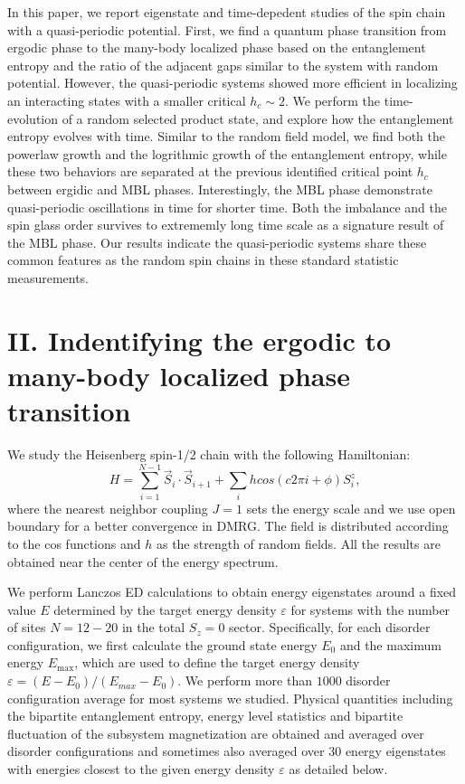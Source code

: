 \documentclass[prl,aps,epsf,showpacs,twocolumn]{revtex4}
\begin{document}
In this paper, we report  eigenstate and  time-depedent studies of the spin chain with a quasi-periodic potential.
First, we find a  quantum phase transition from ergodic phase to the many-body localized phase based on the
entanglement entropy and the ratio of the adjacent gaps similar to the system with random potential. However,  the quasi-periodic
systems showed more efficient in localizing an interacting states with a smaller critical $h_c \sim 2$.     
We perform the time-evolution of a random selected  product state, and explore how the entanglement entropy
evolves with time.  Similar to the random field model, we find both the powerlaw  growth and the logrithmic growth
of the entanglement entropy,  while these two  behaviors are separated at the previous identified critical point
$h_c$ between ergidic and MBL phases.   Interestingly,  the MBL phase demonstrate quasi-periodic oscillations
in time for shorter time.  Both the imbalance and the spin glass order survives to extrememly long time scale
as a signature result of the MBL phase.   Our results indicate the quasi-periodic systems share these common
features as the random spin chains in these standard statistic measurements. 



\section{II.  Indentifying the ergodic to many-body localized phase transition}

We  study  the Heisenberg  spin-1/2 chain   
with  the following Hamiltonian:
\begin{equation}
 H =  \sum_{i=1}^{N-1} \vec{S}_i \cdot \vec{S}_{i+1}
  + \sum_{i} hcos(c2\pi i+\phi) S_i^z,\nonumber
\end{equation}
where the nearest neighbor  
 coupling  $J=1$  sets   the 
energy scale  and we use open boundary for a  better convergence  in DMRG.
The field  is distributed according to the cos functions and 
$h$ as the strength of  random fields.
All the results are obtained near  the center of the energy spectrum.


We  perform Lanczos ED calculations     to obtain  energy eigenstates around a fixed value
$E$ determined by the target  energy density $\varepsilon$ for  systems with the number of sites
$N=12-20$  in the total $S_z=0$ sector.
Specifically, for each disorder configuration, we first calculate the
ground state energy  $E_0$ and the maximum energy $E_\text{max}$, which are  used to define the target
energy density $\varepsilon = (E-E_0)/(E_{max} -E_0)$.
We perform more than $1000$ disorder configuration average for most  systems we studied.
Physical quantities\cite{luitz2015}  including the bipartite entanglement entropy,  energy level statistics and
bipartite  fluctuation of the subsystem magnetization are obtained and averaged over
  disorder configurations and sometimes also averaged over  30 energy eigenstates with energies closest to the given
energy density $\varepsilon$ as detailed below.
\end{document}
